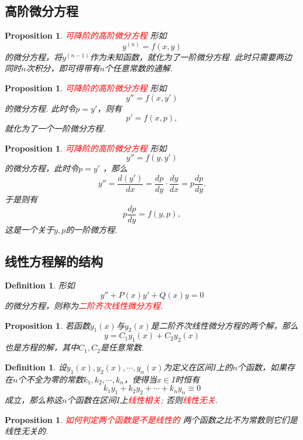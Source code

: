 \documentclass{article}
\newtheorem{proposition}[theorem]{Proposition}
\newtheorem{definition}[theorem]{Definition}
\newcommand{\redt}[1]{\textcolor{red}{#1}}
\begin{document}
\subsection{高阶微分方程}


\begin{proposition}
\rm \redt{可降阶的高阶微分方程} 形如
$$
y^{(n)}=f(x,y)
$$
的微分方程，将$y^{(n-1)}$作为未知函数，就化为了一阶微分方程. 此时只需要两边同时$n$次积分，即可得带有$n$个任意常数的通解.  
\end{proposition}

\begin{proposition}
\rm \redt{可降阶的高阶微分方程} 形如
$$
y'' = f(x,y')
$$
的微分方程. 此时令$p=y'$，则有
$$
p' = f(x,p),
$$
就化为了一个一阶微分方程. 
\end{proposition}

\begin{proposition}
\rm \redt{可降阶的高阶微分方程} 形如
$$
y'' = f(y,y')
$$
的微分方程，此时令$p = y'$ ，那么
$$
y'' = \frac{d(y')}{dx} = \frac{dp}{dy} \cdot \frac{dy}{dx} = p \frac{dp}{dy}. 
$$
于是则有
$$
p \frac{dp}{dy} = f(y,p),
$$
这是一个关于$y,p$的一阶微方程. 
\end{proposition}

\subsection{线性方程解的结构}

\begin{definition}
\rm 形如
$$
y''+P(x)y'+Q(x)y = 0
$$
的微分方程，则称为\redt{二阶齐次线性微分方程}.
\end{definition}

\begin{proposition}
\rm 若函数$y_1(x)$与$y_2(x)$是二阶齐次线性微分方程的两个解，那么
$$
y = C_1y_1(x) + C_2y_2(x)
$$
也是方程的解，其中$C_1,C_2$是任意常数. 
\end{proposition}

\begin{definition}
\rm 设$y_1(x),y_2(x),\cdots,y_n(x)$为定义在区间$I$上的$n$个函数，如果存在$n$个不全为零的常数$k_1,k_2,\cdots,k_n$，使得当$x \in I$时恒有
$$
k_1 y_1 + k_2y_2 +\cdots + k_ny_n \equiv 0
$$
成立，那么称这$n$个函数在区间$I$上\redt{线性相关}; 否则\redt{线性无关}. 
\end{definition}

\begin{proposition}
\rm \redt{如何判定两个函数是不是线性的} 两个函数之比不为常数则它们是线性无关的. 
\end{proposition}
\end{document}
